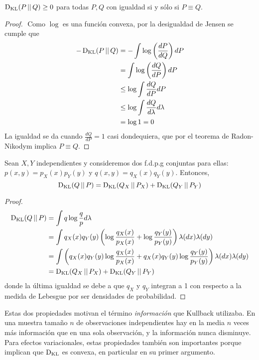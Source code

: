 \documentclass[main.tex]{subfiles}
\begin{document}
\begin{prop}\label{prop:gibbs}
$\operatorname*{D_{KL}}(P\operatorname*{\mid\mid} Q)\geq 0$ para todas $P, Q$ con igualdad si y sólo si $P\equiv Q$.
\end{prop}
\begin{proof}$ $ \newline
Como $\log$ es una función convexa, por la desigualdad de Jensen se cumple que
\begin{align*}
	-\operatorname*{D_{KL}}(P\operatorname*{\mid\mid} Q) &= -\int\log\left(\frac{dP}{dQ}\right)dP \\
		&= \int\log\left(\frac{dQ}{dP}\right)dP \\
		&\leq \log\int\frac{dQ}{dP}dP \\
		&\leq \log\int\frac{dQ}{d\lambda}d\lambda \\
		&=\log1=0
\end{align*}
La igualdad se da cuando $\frac{dQ}{dP}=1$ casi dondequiera, que por el teorema de Radon-Nikodym implica $P\equiv Q$. 
\end{proof}

\begin{prop}[Aditividad]\label{prop:kl-add}
Sean $X, Y$ independientes y consideremos dos f.d.p.g conjuntas  para ellas: $p(x, y)=p_X(x)p_Y(y)$ y $q(x,y)=q_X(x)q_Y(y)$. Entonces, 
\begin{equation*}
\operatorname*{D_{KL}}(Q\operatorname*{\mid\mid} P) = \operatorname*{D_{KL}}(Q_X\operatorname*{\mid\mid} P_X) + \operatorname*{D_{KL}}(Q_Y\operatorname*{\mid\mid} P_Y)
\end{equation*}
\end{prop}

\begin{proof}$ $ \newline
\begin{align*}
	\operatorname*{D_{KL}}(Q\operatorname*{\mid\mid} P) &= \int q\log\frac{q}{p}d\lambda \\
	&= \int q_X(x)q_Y(y)\left(\log\frac{q_X(x)}{p_X(x)}+\log\frac{q_Y(y)}{p_Y(y)}\right)\lambda(dx)\lambda(dy) \\
	&= \int \left(q_X(x)q_Y(y)\log\frac{q_X(x)}{p_X(x)} + q_X(x)q_Y(y)\log\frac{q_Y(y)}{p_Y(y)}\right)\lambda(dx)\lambda(dy) \\
	&= \operatorname*{D_{KL}}(Q_X\operatorname*{\mid\mid} P_X) + \operatorname*{D_{KL}}(Q_Y\operatorname*{\mid\mid} P_Y)
\end{align*}
donde la última igualdad se debe a que $q_X$ y $q_Y$ integran a 1 con respecto a la medida de Lebesgue por ser densidades de probabilidad.
\end{proof}

Estas dos propiedades motivan el término \textit{información} que Kullback utilizaba. En una muestra tamaño $n$ de observaciones independientes hay en la media $n$ veces más información que en una sola observación, y la información nunca disminuye. Para efectos variacionales, estas propiedades también son importantes porque implican que $\operatorname*{D_{KL}}$ es convexa, en particular en su primer argumento.
\end{document}

